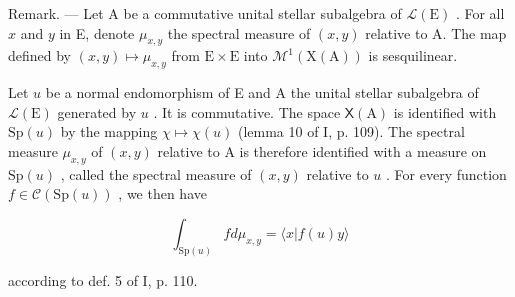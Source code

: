 Remark. --- Let A be a commutative unital stellar subalgebra of \(\mathcal{L}(\mathrm{E})\) . For all \(x\) and \(y\) in E, denote \(\mu_{x,y}\) the spectral measure of \((x,y)\) relative to A. The map defined by \((x,y) \mapsto \mu_{x,y}\) from \(\mathrm{E} \times \mathrm{E}\) into \(\mathcal{M}^1(\mathrm{X}(\mathrm{A}))\) is sesquilinear.

Let \(u\) be a normal endomorphism of E and A the unital stellar subalgebra of \(\mathcal{L}(\mathrm{E})\) generated by \(u\) . It is commutative. The space \(\mathsf{X}(\mathrm{A})\) is identified with \(\mathrm{Sp}(u)\) by the mapping \(\chi \mapsto \chi(u)\) (lemma 10 of I, p. 109). The spectral measure \(\mu_{x,y}\) of \((x,y)\) relative to A is therefore identified with a measure on \(\mathrm{Sp}(u)\) , called the spectral measure of \((x,y)\) relative to \(u\) . For every function \(f \in \mathcal{C}(\mathrm{Sp}(u))\) , we then have

\[
\int_ {\mathrm{Sp} (u)} f d \mu_ {x, y} = \langle x | f (u) y \rangle
\]

according to def. 5 of I, p. 110.

